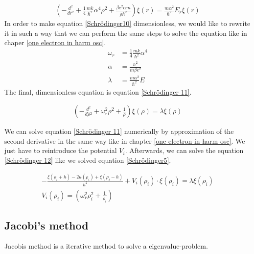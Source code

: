 \documentclass[10pt,a4paper]{article}
\begin{document}
\begin{align}
	\left(-\frac{d^2}{dr^2}+\frac{1}{4}\frac{mk}{\hbar^2} \alpha^4 \rho^2 + \frac{\beta e^2 \alpha m }{\rho \hbar^2} \right) \xi(r) = \frac{m \alpha^2}{\hbar^2} E_r \xi(r) \label{Schrödinger10}
\end{align}
In order to make equation \ref{Schrödinger10} dimensionless, we would like to rewrite it in such a way that we can perform the same steps to solve the equation like in chaper \ref{one electron in harm osc}. 
\begin{align}
	\omega_r &= \frac{1}{4} \frac{mk}{\hbar^2} \alpha^4 \\
	\alpha &=  \frac{\hbar^2}{m \beta e^2} \\
	\lambda &= \frac{m \alpha^2}{\hbar^2} E
\end{align}
The final, dimensionless equation is equation \ref{Schrödinger 11}. 

\begin{align}
	\left(-\frac{d^2}{d \rho^2}+ \omega_r^2 \rho^2 + \frac{1}{\rho} \right) \xi(\rho) = \lambda \xi(\rho) \label{Schrödinger 11}
\end{align}

We can solve equation \ref{Schrödinger 11} numerically by approximation of the second derivative in the same way like in chapter \ref{one electron in harm osc}. We just have to reintroduce the potential $V_i$. Afterwards, we can solve the equation \ref{Schrödinger 12} like we solved equation \ref{Schrödinger5}. 

\begin{align}
	-\frac{\xi(\rho_i+h)-2u(\rho_i)+\xi(\rho_i-h)}{h^2}+V_i(\rho_i) \cdot \xi(\rho_i) = \lambda \xi(\rho_i) \label{Schrödinger 12}\\
	V_i(\rho_i) = \left( \omega_r^2 \rho_i^2 + \frac{1}{\rho_i} \right)
\end{align}


\subsection{Jacobi's method \label{Jacobis method}}

Jacobis method is a iterative method to solve a eigenvalue-problem. 
\end{document}
